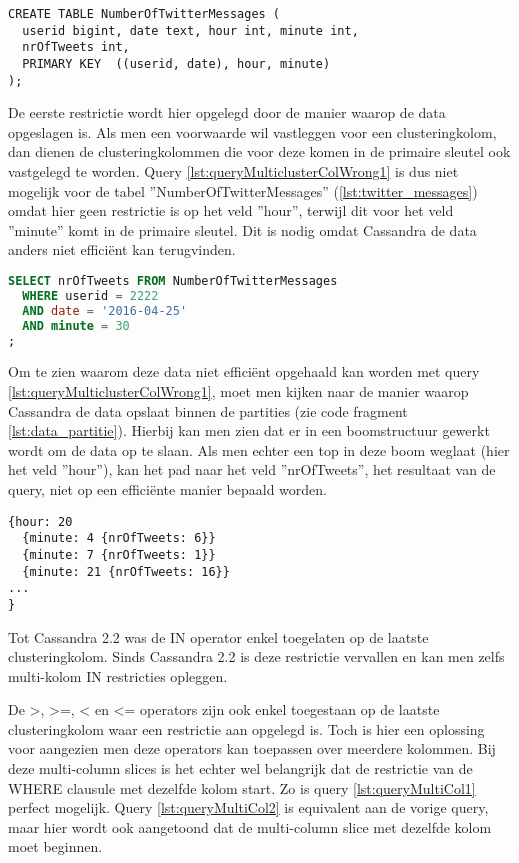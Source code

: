 \begin{lstlisting}[caption={Layout van de tabel NumberOfTwitterMessages}, label={lst:twitter_messages}]
CREATE TABLE NumberOfTwitterMessages (
  userid bigint, date text, hour int, minute int,
  nrOfTweets int,
  PRIMARY KEY  ((userid, date), hour, minute)
);

\end{lstlisting}

De eerste restrictie wordt hier opgelegd door de manier waarop de data opgeslagen is.
Als men een voorwaarde wil vastleggen voor een clusteringkolom, dan dienen de clusteringkolommen die voor deze komen in de primaire sleutel ook vastgelegd te worden.
Query \ref{lst:queryMulticlusterColWrong1} is dus niet mogelijk voor de tabel ''NumberOfTwitterMessages'' (\ref{lst:twitter_messages}) omdat hier geen restrictie is op het veld ''hour'', terwijl dit voor het veld ''minute'' komt in de primaire sleutel.
Dit is nodig omdat Cassandra de data anders niet efficiënt kan terugvinden.

\begin{lstlisting}[caption={Foutieve query bij meerdere partitiekolommen}, label={lst:queryMulticlusterColWrong1}, language=SQL]
SELECT nrOfTweets FROM NumberOfTwitterMessages
  WHERE userid = 2222
  AND date = '2016-04-25'
  AND minute = 30
;
\end{lstlisting}

Om te zien waarom deze data niet efficiënt opgehaald kan worden met query \ref{lst:queryMulticlusterColWrong1}, moet men kijken naar de manier waarop Cassandra de data opslaat binnen de partities (zie code fragment \ref{lst:data_partitie}).
Hierbij kan men zien dat er in een boomstructuur gewerkt wordt om de data op te slaan.
Als men echter een top in deze boom weglaat (hier het veld ''hour''), kan het pad naar het veld ''nrOfTweets'', het resultaat van de query, niet op een efficiënte manier bepaald worden.

\begin{lstlisting}[caption={Data opslag binnen een partitie}, label={lst:data_partitie}]
{hour: 20 
  {minute: 4 {nrOfTweets: 6}} 
  {minute: 7 {nrOfTweets: 1}}
  {minute: 21 {nrOfTweets: 16}}
...
}
\end{lstlisting}

Tot Cassandra 2.2 was de IN operator enkel toegelaten op de laatste clusteringkolom.
Sinds Cassandra 2.2 is deze restrictie vervallen en kan men zelfs multi-kolom IN restricties opleggen.

De >, >=, < en <= operators zijn ook enkel toegestaan op de laatste clusteringkolom waar een restrictie aan opgelegd is.
Toch is hier een oplossing voor aangezien men deze operators kan toepassen over meerdere kolommen.
Bij deze multi-column slices is het echter wel belangrijk dat de restrictie van de WHERE clausule met dezelfde kolom start.
Zo is query \ref{lst:queryMultiCol1} perfect mogelijk.
Query \ref{lst:queryMultiCol2} is equivalent aan de vorige query, maar hier wordt ook aangetoond dat de multi-column slice met dezelfde kolom moet beginnen.

